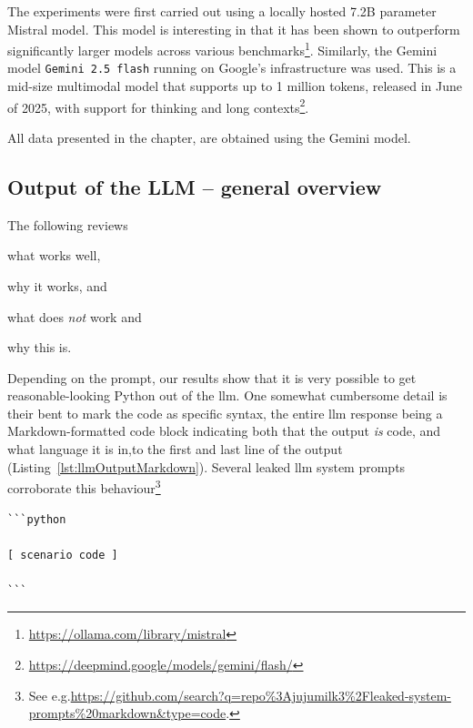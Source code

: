 The experiments were first carried out using a locally hosted \num{7.2}B parameter Mistral model.
This model is interesting in that it has been shown to outperform significantly larger models
across various benchmarks\footnote{\url{https://ollama.com/library/mistral}}.
Similarly, the Gemini model \texttt{Gemini 2.5 flash} running on Google's infrastructure was used.
This is a mid-size multimodal model that supports up to 1 million tokens, released in June of 2025,
with support for thinking and long
contexts\footnote{\url{https://deepmind.google/models/gemini/flash/}}.

All data presented in the  chapter, are obtained using the Gemini model.


\subsection{Output of the LLM -- general overview}

The following reviews \begin{inparaenum}
    \item what works well,
    \item why it works, and
    \item what does \emph{not} work and
    \item why this is.
\end{inparaenum}

Depending on the prompt, our results show that it is very possible to get reasonable-looking Python
out of the \acrshort{llm}. One somewhat cumbersome detail is their bent to mark the code as specific
syntax, the entire \acrshort{llm} response being a Markdown-formatted code block indicating both
that the output \emph{is} code, and what language it is in,to the first and last line of the output
(Listing~\ref{lst:llmOutputMarkdown}). Several leaked \acrshort{llm} system prompts corroborate this
behaviour\footnote{\raggedright See e.g.\url{https://github.com/search?q=repo\%3Ajujumilk3\%2Fleaked-system-prompts\%20markdown&type=code}.}

\newpage %

\begin{lstlisting}[caption={LLM-generated Python code with Markdown syntax. The bracketed part on line 3 has been added for demonstration purposes, removing the actual code for brevity.}, label={lst:llmOutputMarkdown}]
```python

[ scenario code ]

```
\end{lstlisting}

